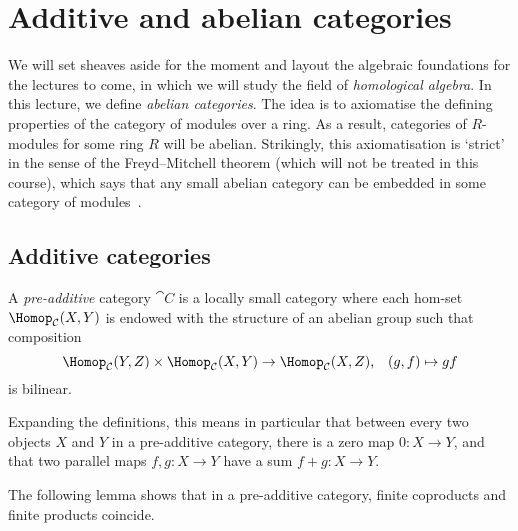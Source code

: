 \documentclass[../main.tex]{subfiles}
\begin{document}
\chapter{Additive and abelian categories}\label{lecture:8}
We will set sheaves aside for the moment and layout the algebraic foundations for the lectures to come, in which we will study the field of \emph{homological algebra}.
In this lecture, we define \emph{abelian categories}.
The idea is to axiomatise the defining properties of the category of modules over a ring.
As a result, categories of \(R\)-modules for some ring \(R\) will be abelian.
Strikingly, this axiomatisation is `strict' in the sense of the Freyd--Mitchell theorem (which will not be treated in this course), which says that any small abelian category can be embedded in some category of modules~\cite[Theorem~1.6.1]{WeibelHomologicalAlgebra}. 

\section{Additive categories}
\begin{defn}
A \emph{pre-additive} category $\cat C$ is a locally small category where each hom-set $\Hom_{\cat C}(X, Y)$ is endowed with the structure of an abelian group such that composition
\[ \Hom[\cat C](Y,Z)\times\Hom[\cat C](X,Y) \to \Hom[\cat C](X,Z)\text{,} \quad (g,f)\mapsto gf \]
is bilinear.
\end{defn}

Expanding the definitions, this means in particular that between every two objects \(X\) and \(Y\) in a pre-additive category, there is a zero map \(0\colon X\to Y\), and that two parallel maps \(f,g\colon X\to Y\) have a sum \(f+g\colon X\to Y\).

The following lemma shows that in a pre-additive category, finite coproducts and finite products coincide.
\end{document}
